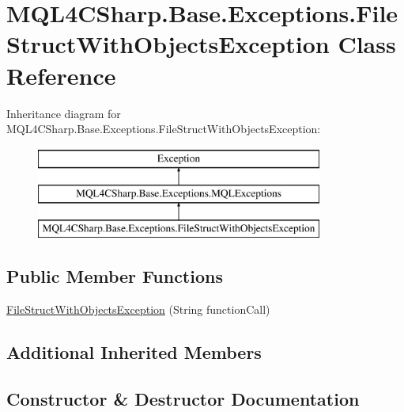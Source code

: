 \hypertarget{class_m_q_l4_c_sharp_1_1_base_1_1_exceptions_1_1_file_struct_with_objects_exception}{}\section{M\+Q\+L4\+C\+Sharp.\+Base.\+Exceptions.\+File\+Struct\+With\+Objects\+Exception Class Reference}
\label{class_m_q_l4_c_sharp_1_1_base_1_1_exceptions_1_1_file_struct_with_objects_exception}
Inheritance diagram for M\+Q\+L4\+C\+Sharp.\+Base.\+Exceptions.\+File\+Struct\+With\+Objects\+Exception\+:\begin{figure}[H]
\begin{center}
\leavevmode
\includegraphics[height=3.000000cm]{class_m_q_l4_c_sharp_1_1_base_1_1_exceptions_1_1_file_struct_with_objects_exception}
\end{center}
\end{figure}
\subsection*{Public Member Functions}
\begin{DoxyCompactItemize}
\item 
\hyperlink{class_m_q_l4_c_sharp_1_1_base_1_1_exceptions_1_1_file_struct_with_objects_exception_aa3888d54391b8f055bea999187becfde}{File\+Struct\+With\+Objects\+Exception} (String function\+Call)
\end{DoxyCompactItemize}
\subsection*{Additional Inherited Members}


\subsection{Constructor \& Destructor Documentation}
